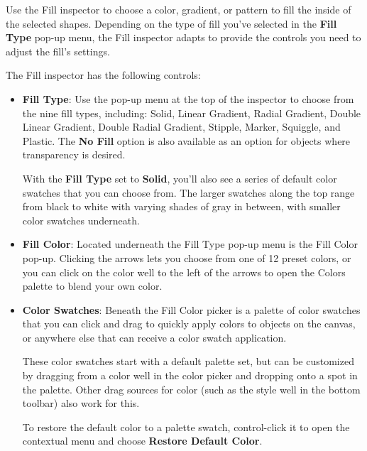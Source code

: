 \documentclass[../main.tex]{subfiles}
\begin{document}
Use the Fill inspector to choose a color, gradient, or pattern to fill the inside of the
selected shapes. Depending on the type of fill you've selected in the \textbf{Fill Type}
pop-up menu, the Fill inspector adapts to provide the controls you need to adjust the fill's
settings.



The Fill inspector has the following controls:

\begin{itemize}
  \item \textbf{Fill Type}: Use the pop-up menu at the top of the inspector to choose from the
    nine fill types, including: Solid, Linear Gradient, Radial Gradient, Double Linear Gradient,
    Double Radial Gradient, Stipple, Marker, Squiggle, and Plastic. The \textbf{No Fill} option
    is also available as an option for objects where transparency is desired.

    With the \textbf{Fill Type} set to \textbf{Solid}, you'll also see a series of default color
    swatches that you can choose from. The larger swatches along the top range from black to
    white with varying shades of gray in between, with smaller color swatches underneath.
  \item \textbf{Fill Color}: Located underneath the Fill Type pop-up menu is the Fill Color
    pop-up. Clicking the arrows lets you choose from one of 12 preset colors, or you can click
    on the color well to the left of the arrows to open the Colors palette to blend your own
    color.
  \item \textbf{Color Swatches}: Beneath the Fill Color picker is a palette of color swatches
    that you can click and drag to quickly apply colors to objects on the canvas, or anywhere
    else that can receive a color swatch application.

    These color swatches start with a default palette set, but can be customized by dragging from
    a color well in the color picker and dropping onto a spot in the palette. Other drag sources
    for color (such as the style well in the bottom toolbar) also work for this.

    To restore the default color to a palette swatch, control-click it to open the contextual menu
    and choose \textbf{Restore Default Color}.
\end{itemize}
\end{document}
